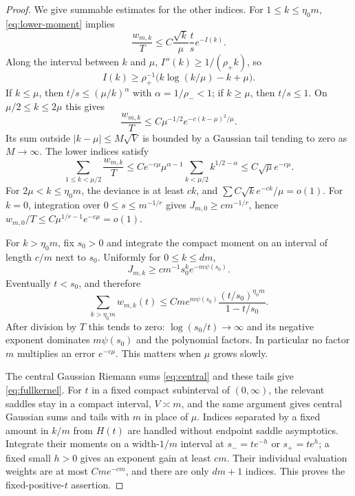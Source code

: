 \documentclass[11pt]{article}
\theoremstyle{remark}\newtheorem{remark}[theorem]{Remark}
\begin{document}
\begin{proof}
We give summable estimates for the other indices. For
$1\leq k\leq\eta_0m$, \eqref{eq:lower-moment} implies
\[
 \frac{w_{m,k}}T\leq C\frac{\sqrt k}{\mu}\frac ts e^{-I(k)}.
\]
Along the interval between $k$ and $\mu$,
$I''(k)\geq1/(\rho_+k)$, so
\[
 I(k)\geq\rho_+^{-1}\bigl(k\log(k/\mu)-k+\mu\bigr).
\]
If $k\leq\mu$, then $t/s\leq(\mu/k)^\alpha$ with
$\alpha=1/\rho_-<1$; if $k\geq\mu$, then $t/s\leq1$.
On $\mu/2\leq k\leq2\mu$ this gives
\[
 \frac{w_{m,k}}T\leq C\mu^{-1/2}
 e^{-c(k-\mu)^2/\mu}.
\]
Its sum outside $|k-\mu|\leq M\sqrt V$ is bounded by a Gaussian
tail tending to zero as $M\to\infty$. The lower indices satisfy
\[
 \sum_{1\leq k<\mu/2}\frac{w_{m,k}}T
 \leq Ce^{-c\mu}\mu^{\alpha-1}
 \sum_{k<\mu/2}k^{1/2-\alpha}
 \leq C\sqrt\mu e^{-c\mu}.
\]
For $2\mu<k\leq\eta_0m$, the deviance is at least $ck$, and
$\sum C\sqrt{k}e^{-ck}/\mu=o(1)$.
For $k=0$, integration over $0\leq s\leq m^{-1/r}$ gives
$J_{m,0}\geq cm^{-1/r}$, hence
$w_{m,0}/T\leq C\mu^{1/r-1}e^{-c\mu}=o(1)$.

For $k>\eta_0m$, fix $s_0>0$ and integrate the compact moment on an
interval of length $c/m$ next to $s_0$. Uniformly for $0\leq k\leq dm$,
\[
 J_{m,k}\geq cm^{-1}s_0^ke^{-m\psi(s_0)}.
\]
Eventually $t<s_0$, and therefore
\[
 \sum_{k>\eta_0m}w_{m,k}(t)
 \leq Cm e^{m\psi(s_0)}
 \frac{(t/s_0)^{\eta_0m}}{1-t/s_0}.
\]
After division by $T$ this tends to zero: $\log(s_0/t)\to\infty$
and its negative exponent dominates $m\psi(s_0)$ and the polynomial
factors. In particular no factor $m$ multiplies an error $e^{-c\mu}$.
This matters when $\mu$ grows slowly.

The central Gaussian Riemann sums \eqref{eq:central} and these tails
give \eqref{eq:fullkernel}.
For $t$ in a fixed compact subinterval of $(0,\infty)$, the relevant
saddles stay in a compact interval, $V\asymp m$, and the same argument
gives central Gaussian sums and tails with $m$ in place of $\mu$.
Indices separated by a fixed amount in $k/m$ from $H(t)$ are handled
without endpoint saddle asymptotics. Integrate their moments on a
width-$1/m$ interval at $s_-=te^{-h}$ or $s_+=te^h$; a fixed small
$h>0$ gives an exponent gain at least $cm$. Their individual evaluation
weights are at most $Cm e^{-cm}$, and there are only $dm+1$ indices.
This proves the fixed-positive-$t$ assertion.
\end{proof}
\end{document}
